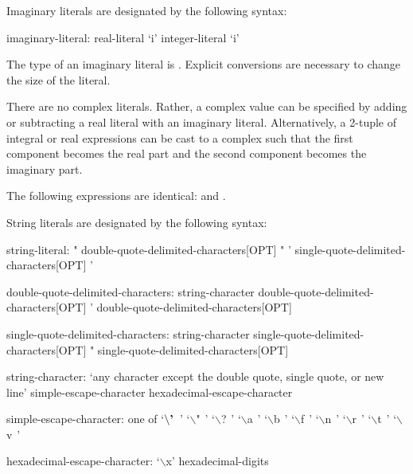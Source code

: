 Imaginary literals are designated by the following syntax:
\begin{syntax}
imaginary-literal:
  real-literal `i'
  integer-literal `i'
\end{syntax}
The type of an imaginary literal is .  Explicit conversions
are necessary to change the size of the literal.

There are no complex literals.  Rather, a complex value can be
specified by adding or subtracting a real literal with an imaginary
literal.  Alternatively, a 2-tuple of integral or real expressions can
be cast to a complex such that the first component becomes the real
part and the second component becomes the imaginary part.
\begin{example}
The following expressions are identical: 
and .
\end{example}

String literals are designated by the following syntax:
\begin{syntax}
string-literal:
  " double-quote-delimited-characters[OPT] "
  ' single-quote-delimited-characters[OPT] '

double-quote-delimited-characters:
  string-character double-quote-delimited-characters[OPT]
  ' double-quote-delimited-characters[OPT]

single-quote-delimited-characters:
  string-character single-quote-delimited-characters[OPT]
  " single-quote-delimited-characters[OPT]

string-character:
  `any character except the double quote, single quote, or new line'
  simple-escape-character
  hexadecimal-escape-character

simple-escape-character: one of
  `$\backslash\mbox{\bf '}\hspace{5pt}$' `$\backslash$"$\hspace{5pt}$' `$\backslash$?$\hspace{5pt}$' `$\backslash$a$\hspace{5pt}$' `$\backslash$b$\hspace{5pt}$' `$\backslash$f$\hspace{5pt}$' `$\backslash$n$\hspace{5pt}$' `$\backslash$r$\hspace{5pt}$' `$\backslash$t$\hspace{5pt}$' `$\backslash$v$\hspace{5pt}$'

hexadecimal-escape-character:
  `$\backslash$x' hexadecimal-digits
\end{syntax}


